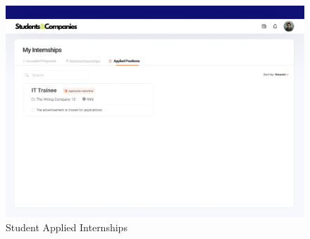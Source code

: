 \documentclass[a4paper,12pt]{article}
\begin{document}
\begin{figure}[H]
    \centering
    \includegraphics[scale = 0.42]{figures/UserInterfaces/Student/AppliedPositions.png}
    \caption{Student Applied Internships}
     \centering
\end{figure}
\end{document}
